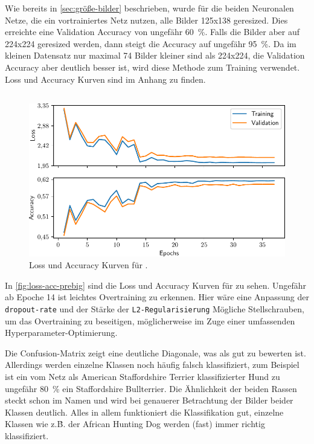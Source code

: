 Wie bereits in \autoref{sec:größe-bilder} beschrieben, wurde für die beiden
Neuronalen Netze, die ein vortrainiertes Netz nutzen, alle Bilder 125x138
geresized. Dies erreichte eine Validation Accuracy von ungefähr \SI{60}{\percent}.
Falls die Bilder aber auf 224x224 geresized werden, dann steigt die Accuracy
auf ungefähr \SI{95}{\percent}. Da im kleinen Datensatz nur maximal 74 Bilder
kleiner sind als 224x224, die Validation Accuracy aber deutlich besser ist, wird diese Methode zum Training verwendet.
Loss und Accuracy Kurven sind im Anhang zu finden.

\subsection{\PreBig{}}

\begin{figure}
  \centering
  \includegraphics[scale=0.8]{pics/ergebnisse/PreBigDogNN/history_epoch.pdf}
  \caption{Loss und Accuracy Kurven für \PreBig{}.}
  \label{fig:loss-acc-prebig}
\end{figure}

In \autoref{fig:loss-acc-prebig} sind die Loss und Accuracy Kurven für \PreBig{}
zu sehen. Ungefähr ab Epoche 14 ist leichtes Overtraining zu erkennen. Hier
wäre eine Anpassung der \texttt{dropout-rate} und der Stärke der \texttt{L2-Regularisierung}
Mögliche Stellschrauben, um das Overtraining zu beseitigen, möglicherweise im Zuge
einer umfassenden Hyperparameter-Optimierung.

Die Confusion-Matrix zeigt eine deutliche Diagonale, was als gut zu bewerten ist.
Allerdings werden einzelne Klassen noch häufig falsch klassifiziert, zum Beispiel
ist ein vom Netz als American Staffordshire Terrier klassifizierter Hund zu ungefähr
\SI{80}{\percent} ein Staffordshire Bullterrier. Die Ähnlichkeit der beiden Rassen
steckt schon im Namen und wird bei genauerer Betrachtung der Bilder beider Klassen
deutlich. Alles in allem funktioniert die Klassifikation gut, einzelne Klassen
wie z.\.B. der African Hunting Dog werden (fast) immer richtig klassifiziert.

